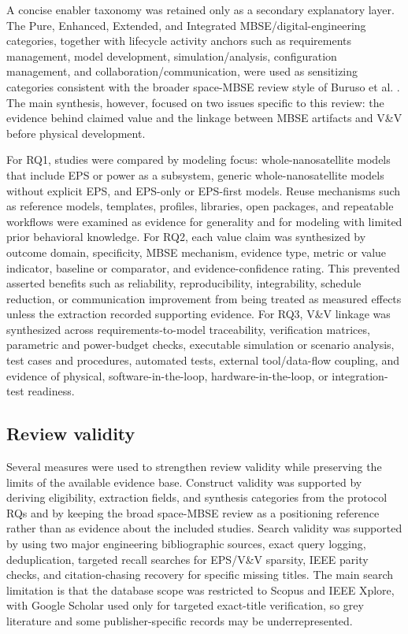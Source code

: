 A concise enabler taxonomy was retained only as a secondary explanatory layer.  The Pure, Enhanced, Extended, and Integrated MBSE/digital-engineering categories, together with lifecycle activity anchors such as requirements management, model development, simulation/analysis, configuration management, and collaboration/communication, were used as sensitizing categories consistent with the broader space-MBSE review style of Buruso et al. \cite{Buruso2026MBSESpace}.  The main synthesis, however, focused on two issues specific to this review: the evidence behind claimed value and the linkage between MBSE artifacts and V\&V before physical development.

For RQ1, studies were compared by modeling focus: whole-nanosatellite models that include EPS or power as a subsystem, generic whole-nanosatellite models without explicit EPS, and EPS-only or EPS-first models.  Reuse mechanisms such as reference models, templates, profiles, libraries, open packages, and repeatable workflows were examined as evidence for generality and for modeling with limited prior behavioral knowledge.  For RQ2, each value claim was synthesized by outcome domain, specificity, MBSE mechanism, evidence type, metric or value indicator, baseline or comparator, and evidence-confidence rating.  This prevented asserted benefits such as reliability, reproducibility, integrability, schedule reduction, or communication improvement from being treated as measured effects unless the extraction recorded supporting evidence.  For RQ3, V\&V linkage was synthesized across requirements-to-model traceability, verification matrices, parametric and power-budget checks, executable simulation or scenario analysis, test cases and procedures, automated tests, external tool/data-flow coupling, and evidence of physical, software-in-the-loop, hardware-in-the-loop, or integration-test readiness.

\subsection{Review validity}
Several measures were used to strengthen review validity while preserving the limits of the available evidence base.  Construct validity was supported by deriving eligibility, extraction fields, and synthesis categories from the protocol RQs and by keeping the broad space-MBSE review \cite{Buruso2026MBSESpace} as a positioning reference rather than as evidence about the included studies.  Search validity was supported by using two major engineering bibliographic sources, exact query logging, deduplication, targeted recall searches for EPS/V\&V sparsity, IEEE parity checks, and citation-chasing recovery for specific missing titles.  The main search limitation is that the database scope was restricted to Scopus and IEEE Xplore, with Google Scholar used only for targeted exact-title verification, so grey literature and some publisher-specific records may be underrepresented.

